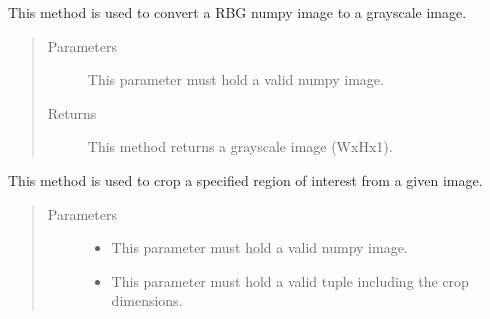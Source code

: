\documentclass[letterpaper,10pt,english,openany,oneside]{sphinxmanual}
\begin{document}
\begin{fulllineitems}
\begin{fulllineitems}
\begin{quote}
\begin{description}
\end{description}\end{quote}

\end{fulllineitems}


\begin{fulllineitems}
\label{\detokenize{PreProcessing:sbd.PreProcessing.PreProcessing.convertRGB2Gray}}
This method is used to convert a RBG numpy image to a grayscale image.
\begin{quote}\begin{description}
\item[{Parameters}] \leavevmode
{} \textendash{} This parameter must hold a valid numpy image.

\item[{Returns}] \leavevmode
This method returns a grayscale image (WxHx1).

\end{description}\end{quote}

\end{fulllineitems}


\begin{fulllineitems}
\label{\detokenize{PreProcessing:sbd.PreProcessing.PreProcessing.crop}}
This method is used to crop a specified region of interest from a given image.
\begin{quote}\begin{description}
\item[{Parameters}] \leavevmode\begin{itemize}
\item {} 
 \textendash{} This parameter must hold a valid numpy image.

\item {} 
 \textendash{} This parameter must hold a valid tuple including the crop dimensions.


\end{itemize}
\end{description}
\end{quote}
\end{fulllineitems}
\end{fulllineitems}
\end{document}
